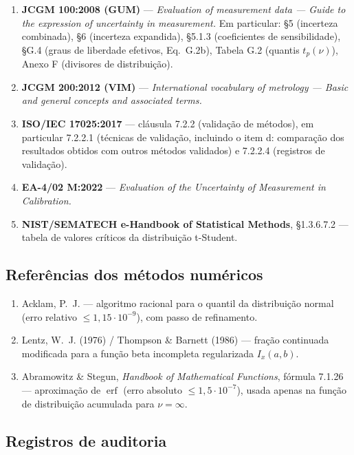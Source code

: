 \documentclass[11pt,a4paper]{article}
\begin{document}
\begin{enumerate}[label=R\arabic*., leftmargin=2.6em]
  \item \textbf{JCGM 100:2008 (GUM)} --- \emph{Evaluation of measurement data --- Guide to the expression of uncertainty in measurement.} Em particular: §5 (incerteza combinada), §6 (incerteza expandida), §5.1.3 (coeficientes de sensibilidade), §G.4 (graus de liberdade efetivos, Eq.~G.2b), Tabela G.2 (quantis \(t_p(\nu)\)), Anexo F (divisores de distribuição).
  \item \textbf{JCGM 200:2012 (VIM)} --- \emph{International vocabulary of metrology --- Basic and general concepts and associated terms.}
  \item \textbf{ISO/IEC 17025:2017} --- cláusula 7.2.2 (validação de métodos), em particular 7.2.2.1 (técnicas de validação, incluindo o item d: comparação dos resultados obtidos com outros métodos validados) e 7.2.2.4 (registros de validação).
  \item \textbf{EA-4/02 M:2022} --- \emph{Evaluation of the Uncertainty of Measurement in Calibration.}
  \item \textbf{NIST/SEMATECH e-Handbook of Statistical Methods}, §1.3.6.7.2 --- tabela de valores críticos da distribuição t-Student.
\end{enumerate}

\subsection{Referências dos métodos numéricos}

\begin{enumerate}[label=N\arabic*., leftmargin=2.6em]
  \item Acklam, P.~J. --- algoritmo racional para o quantil da distribuição normal (erro relativo \(\leq 1{,}15 \cdot 10^{-9}\)), com passo de refinamento.
  \item Lentz, W.~J. (1976) / Thompson \& Barnett (1986) --- fração continuada modificada para a função beta incompleta regularizada \(I_x(a,b)\).
  \item Abramowitz \& Stegun, \emph{Handbook of Mathematical Functions}, fórmula 7.1.26 --- aproximação de \(\operatorname{erf}\) (erro absoluto \(\leq 1{,}5 \cdot 10^{-7}\)), usada apenas na função de distribuição acumulada para \(\nu = \infty\).
\end{enumerate}

\subsection{Registros de auditoria}
\end{document}
